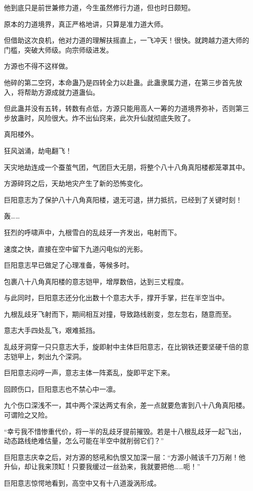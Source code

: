 \begin{this_body}
他到底只是前世兼修力道，今生虽然修行力道，但也时日颇短。

原本的力道境界，真正严格地讲，只算是准力道大师。

但借助这次良机，他对力道的理解扶摇直上，一飞冲天！很快。就跨越力道大师的门槛，突破大师级。向宗师级进发。

方源也不得不这样做。

他碎的第二空窍，本命蛊乃是四转全力以赴蛊。此蛊隶属力道，在第三步首先放入，将帮助方源成就力道蛊仙。

但此蛊并没有五转，转数有点低，方源只能用高人一筹的力道境界弥补，否则第三步放蛊时，风险很大。炸不出仙窍来，此次升仙就彻底失败了。

真阳楼外。

狂风汹涌，劫电翻飞！

天灾地劫连成一个蚕茧气团，气团巨大无朋，将整个八十八角真阳楼都笼罩其中。

方源碎窍之后，天劫地灾产生了新的恐怖变化。

巨阳意志为了保护八十八角真阳楼，退无可退，拼力抵抗，已经到了关键时刻！

轰……

狂烈的呼啸声中，九根雪白的乱歧牙一齐发出，电射而下。

速度之快，直接在空中留下九道闪电似的光影。

巨阳意志早已做足了心理准备，等候多时。

包裹八十八角真阳楼的意志铠甲，增厚数倍，达到三丈程度。

与此同时，巨阳意志还分化出数十个意志大手，撑开手掌，拦在半空当中。

九根乱歧牙飞射而下，期间相互对撞，导致路线剧变，忽左忽右，随意而至。

意志大手四处乱飞，艰难抵挡。

乱歧牙洞穿一只只意志大手，旋即射中主体巨阳意志，在比钢铁还要坚硬千倍的意志铠甲上，刺出九个深洞。

巨阳意志闷哼一声，意志主体一阵紊乱，旋即平定下来。

回顾伤口，巨阳意志也不禁心中一凛。

九个伤口深浅不一，其中两个深达两丈有余，差一点就要危害到八十八角真阳楼。可谓险之又险。

“幸亏我不惜惨重代价，将一半的乱歧牙提前摧毁。若是十八根乱歧牙一起飞出，动态路线绝难估量，怎么可能在半空中就削弱它们？”

巨阳意志庆幸之后，对方源的怒吼和仇恨又加深一层：“方源小贼该千刀万剐！他升仙，却让我来顶缸！只要我缓过一丝劲来，我就要把他……呃！”

巨阳意志惊愕地看到，高空中又有十八道漩涡形成。


\end{this_body}
